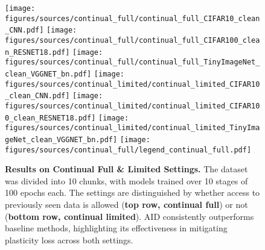 

\begin{figure*}[t]
    \centering
    \texttt{[image: figures/sources/continual\_full/continual\_full\_CIFAR10\_clean\_CNN.pdf]}
    \texttt{[image: figures/sources/continual\_full/continual\_full\_CIFAR100\_clean\_RESNET18.pdf]}
    \texttt{[image: figures/sources/continual\_full/continual\_full\_TinyImageNet\_clean\_VGGNET\_bn.pdf]}
        \texttt{[image: figures/sources/continual\_limited/continual\_limited\_CIFAR10\_clean\_CNN.pdf]}
    \texttt{[image: figures/sources/continual\_limited/continual\_limited\_CIFAR100\_clean\_RESNET18.pdf]}
    \texttt{[image: figures/sources/continual\_limited/continual\_limited\_TinyImageNet\_clean\_VGGNET\_bn.pdf]}
    \texttt{[image: figures/sources/continual\_full/legend\_continual\_full.pdf]}
\caption{\textbf{Results on Continual Full \& Limited Settings.} The dataset was divided into 10 chunks, with models trained over 10 stages of 100 epochs each. The settings are distinguished by whether access to previously seen data is allowed (\textbf{top row, continual full}) or not (\textbf{bottom row, continual limited}). AID consistently outperforms baseline methods, highlighting its effectiveness in mitigating plasticity loss across both settings.}
    
    \label{exp_continual_full}
\end{figure*}


